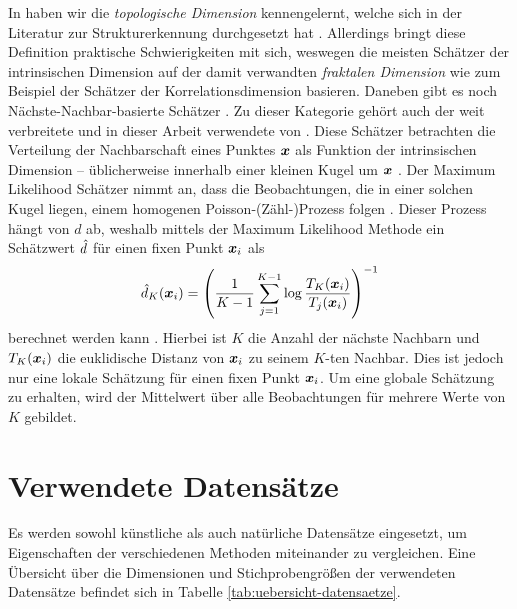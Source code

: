 In  haben wir die \textit{topologische
	Dimension} kennengelernt, welche sich in der Literatur zur Strukturerkennung durchgesetzt hat \parencite[1]{Campadelli.2015}. Allerdings bringt diese Definition praktische Schwierigkeiten mit sich,
weswegen die meisten Schätzer der intrinsischen Dimension auf der damit verwandten
\textit{fraktalen Dimension} wie zum Beispiel der Schätzer der Korrelationsdimension \parencite{Camastra.2002} basieren. Daneben gibt es noch Nächste-Nachbar-basierte Schätzer \parencite[1]{Campadelli.2015}. Zu dieser Kategorie gehört auch der weit verbreitete und in dieser
Arbeit verwendete  von \textcite{Levina.2004}. Diese Schätzer
betrachten die Verteilung der Nachbarschaft eines Punktes $\bm{x}$ als Funktion der
intrinsischen Dimension -- üblicherweise innerhalb einer kleinen Kugel um $\bm{x}$
\parencite[8]{Campadelli.2015}. Der Maximum Likelihood Schätzer nimmt an, dass die Beobachtungen, die
in einer solchen Kugel liegen, einem homogenen Poisson-(Zähl-)Prozess folgen
\parencite[2]{Levina.2004}. Dieser Prozess hängt von $d$ ab, weshalb mittels der Maximum Likelihood
Methode ein Schätzwert $\hat{d}$ für einen fixen Punkt $\bm{x}_i$ als
\begin{equation}
	\hat{d}_K(\bm{x}_i) = \left( \frac{1}{K - 1} \sum_{j=1}^{K - 1} \log \frac{T_K(\bm{x}_i)}{T_j(\bm{x}_i)} \right)^{-1}
\end{equation}
berechnet werden kann \parencite[4]{Levina.2004}. Hierbei ist $K$ die Anzahl der nächste Nachbarn und $T_{K}(\bm{x}_i)$ die
euklidische Distanz von $\bm{x}_i$ zu seinem $K$-ten Nachbar. Dies ist jedoch nur eine lokale
Schätzung für einen fixen Punkt $\bm{x}_i$. Um eine globale Schätzung zu erhalten, wird der
Mittelwert über alle Beobachtungen für mehrere Werte von $K$ gebildet.
\section{Verwendete Datensätze}
\label{ch:Vergleich:sec:VerwendeteDatensaetze}
Es werden sowohl künstliche als auch natürliche Datensätze eingesetzt, um Eigenschaften der
verschiedenen Methoden miteinander zu vergleichen. Eine Übersicht über die Dimensionen und Stichprobengrößen der verwendeten Datensätze befindet sich in Tabelle \ref{tab:uebersicht-datensaetze}.

